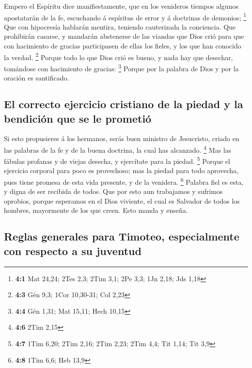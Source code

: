 Empero el Espíritu dice manifiestamente, que en los
venideros tiempos algunos apostatarán de la fe, escuchando á espíritus
de error y á doctrinas de demonios; \footnote{\textbf{4:1} Mat 24,24;
  2Tes 2,3; 2Tim 3,1; 2Pe 3,3; 1Jn 2,18; Jds 1,18}  Que
con hipocresía hablarán mentira, teniendo cauterizada la conciencia.
 Que prohibirán casarse, y mandarán abstenerse de las
viandas que Dios crió para que con hacimiento de gracias participasen de
ellas los fieles, y los que han conocido la verdad. \footnote{\textbf{4:3}
  Gén 9,3; 1Cor 10,30-31; Col 2,23}  Porque todo lo que
Dios crió es bueno, y nada hay que desechar, tomándose con hacimiento de
gracias: \footnote{\textbf{4:4} Gén 1,31; Mat 15,11; Hech 10,15}
 Porque por la palabra de Dios y por la oración es
santificado.

\hypertarget{el-correcto-ejercicio-cristiano-de-la-piedad-y-la-bendiciuxf3n-que-se-le-prometiuxf3}{%
\subsection{El correcto ejercicio cristiano de la piedad y la bendición
que se le
prometió}\label{el-correcto-ejercicio-cristiano-de-la-piedad-y-la-bendiciuxf3n-que-se-le-prometiuxf3}}

 Si esto propusieres á los hermanos, serás buen ministro
de Jesucristo, criado en las palabras de la fe y de la buena doctrina,
la cual has alcanzado. \footnote{\textbf{4:6} 2Tim 2,15} 
Mas las fábulas profanas y de viejas desecha, y ejercítate para la
piedad. \footnote{\textbf{4:7} 1Tim 6,20; 2Tim 2,16; 2Tim 2,23; 2Tim
  4,4; Tit 1,14; Tit 3,9}  Porque el ejercicio corporal
para poco es provechoso; mas la piedad para todo aprovecha, pues tiene
promesa de esta vida presente, y de la venidera. \footnote{\textbf{4:8}
  1Tim 6,6; Heb 13,9}  Palabra fiel es esta, y digna de
ser recibida de todos.  Que por esto aun trabajamos y
sufrimos oprobios, porque esperamos en el Dios viviente, el cual es
Salvador de todos los hombres, mayormente de los que creen.
 Esto manda y enseña.

\hypertarget{reglas-generales-para-timoteo-especialmente-con-respecto-a-su-juventud}{%
\subsection{Reglas generales para Timoteo, especialmente con respecto a
su
juventud}\label{reglas-generales-para-timoteo-especialmente-con-respecto-a-su-juventud}}


